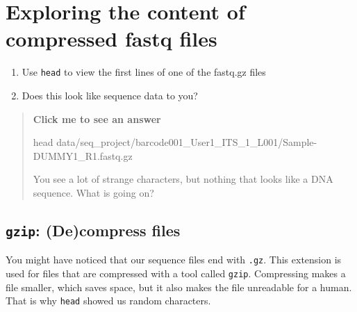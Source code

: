 \documentclass[
  letterpaper,
  DIV=11,
  numbers=noendperiod]{scrreprt}
\newenvironment{Shaded}{}{}
\newcommand{\FunctionTok}[1]{\textcolor[rgb]{0.44,0.26,0.76}{#1}}
\newcommand{\NormalTok}[1]{\textcolor[rgb]{0.14,0.16,0.18}{#1}}
\providecommand{\tightlist}{%
  \setlength{\itemsep}{0pt}\setlength{\parskip}{0pt}}
\begin{document}
\section{Exploring the content of compressed fastq
files}\label{exploring-the-content-of-compressed-fastq-files}

\begin{tcolorbox}[enhanced jigsaw, coltitle=black, breakable, titlerule=0mm, colback=white, rightrule=.15mm, bottomrule=.15mm, toprule=.15mm, colframe=quarto-callout-color-frame, colbacktitle=quarto-callout-color!10!white, bottomtitle=1mm, opacitybacktitle=0.6, toptitle=1mm, leftrule=.75mm, arc=.35mm, title=\textcolor{quarto-callout-color}{\faInfo}\hspace{0.5em}{Exercise}, left=2mm, opacityback=0]

\begin{enumerate}
\def\labelenumi{\arabic{enumi}.}
\tightlist
\item
  Use \texttt{head} to view the first lines of one of the fastq.gz files
\item
  Does this look like sequence data to you?
\end{enumerate}

\begin{quote}
\textbf{Click me to see an answer}

\begin{Shaded}
\begin{Highlighting}[]
\FunctionTok{head}\NormalTok{ data/seq\_project/barcode001\_User1\_ITS\_1\_L001/Sample{-}DUMMY1\_R1.fastq.gz}
\end{Highlighting}
\end{Shaded}

You see a lot of strange characters, but nothing that looks like a DNA
sequence. What is going on?
\end{quote}

\end{tcolorbox}

\subsection{\texorpdfstring{\texttt{gzip}: (De)compress
files}{gzip: (De)compress files}}\label{gzip-decompress-files}

You might have noticed that our sequence files end with \texttt{.gz}.
This extension is used for files that are compressed with a tool called
\texttt{gzip}. Compressing makes a file smaller, which saves space, but
it also makes the file unreadable for a human. That is why \texttt{head}
showed us random characters.
\end{document}
